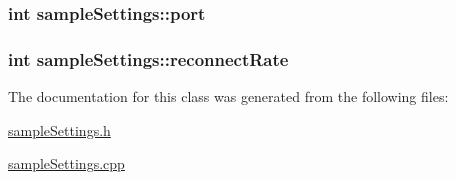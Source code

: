 \hypertarget{classsample_settings_a174a34a6ac173e8ded1b1496526a207e}{
\subsubsection[{port}]{\setlength{\rightskip}{0pt plus 5cm}int sample\+Settings\+::port}}\label{classsample_settings_a174a34a6ac173e8ded1b1496526a207e}
\hypertarget{classsample_settings_aa10ab5fff05664b7249873cea20c8164}{
\subsubsection[{reconnect\+Rate}]{\setlength{\rightskip}{0pt plus 5cm}int sample\+Settings\+::reconnect\+Rate}}\label{classsample_settings_aa10ab5fff05664b7249873cea20c8164}


The documentation for this class was generated from the following files\+:\begin{DoxyCompactItemize}
\item 
\hyperlink{sample_settings_8h}{sample\+Settings.\+h}\item 
\hyperlink{sample_settings_8cpp}{sample\+Settings.\+cpp}\end{DoxyCompactItemize}
